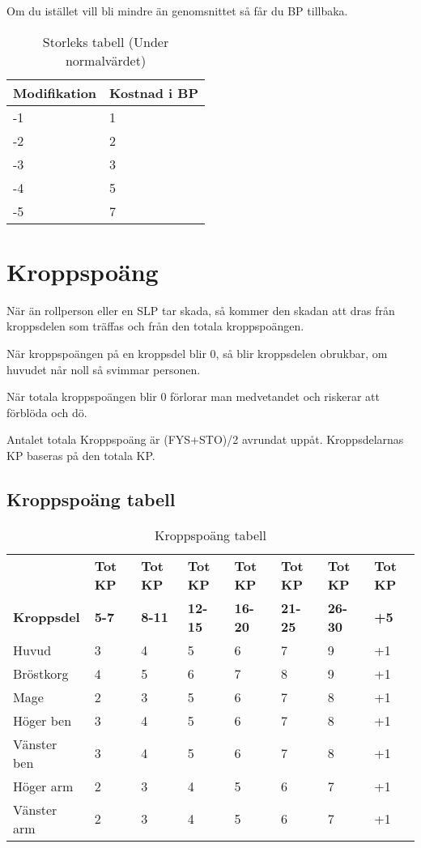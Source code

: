 \documentclass[a4paper, 10pt, titlepage]{article}
\begin{document}
Om du istället vill bli mindre än genomsnittet så får du BP tillbaka.
\begin{table}[hbp]
  \caption{Storleks tabell (Under normalvärdet)}
  \begin{tabular}{|l|l|}
    \hline
    Modifikation & Kostnad i BP \\
    \hline
    -1           & 1            \\
    \hline
    -2           & 2            \\
    \hline
    -3           & 3            \\
    \hline
    -4           & 5            \\
    \hline
    -5           & 7            \\
    \hline
  \end{tabular}
\end{table}

\newpage
\section{Kroppspoäng}
När än rollperson eller en SLP tar skada, så kommer den skadan att dras från kroppsdelen som träffas och från
den totala kroppspoängen.

När kroppspoängen på en kroppsdel blir 0, så blir kroppsdelen obrukbar, om huvudet når noll så svimmar personen.

När totala kroppspoängen blir 0 förlorar man medvetandet och riskerar att förblöda och dö.

Antalet totala Kroppspoäng är (FYS+STO)/2 avrundat uppåt. Kroppsdelarnas KP baseras på den totala KP.

\subsection{Kroppspoäng tabell}
\begin{table}[hbp]
  \caption{Kroppspoäng tabell}
 \begin{tabular}{|l|l|l|l|l|l|l|l|}
   \hline
   ~ & \textbf{Tot KP} & \textbf{Tot KP} & \textbf{Tot KP} & \textbf{Tot KP} & \textbf{Tot KP} & \textbf{Tot KP} & \textbf{Tot KP} \\
   \textbf{Kroppsdel} & \textbf{5-7}   & \textbf{8-11} & \textbf{12-15} & \textbf{16-20} & \textbf{21-25} & \textbf{26-30} & \textbf{+5} \\
   \hline
   Huvud       & 3 & 4 & 5 & 6 & 7 & 9 & +1 \\
   \hline
   Bröstkorg   & 4 & 5 & 6 & 7 & 8 & 9 & +1 \\
   \hline
   Mage        & 2 & 3 & 5 & 6 & 7 & 8 & +1 \\
   \hline
   Höger ben   & 3 & 4 & 5 & 6 & 7 & 8 & +1 \\
   \hline
   Vänster ben & 3 & 4 & 5 & 6 & 7 & 8 & +1 \\
   \hline
   Höger arm   & 2 & 3 & 4 & 5 & 6 & 7 & +1 \\
   \hline
   Vänster arm & 2 & 3 & 4 & 5 & 6 & 7 & +1 \\
   \hline
 \end{tabular}
\end{table}
\end{document}

